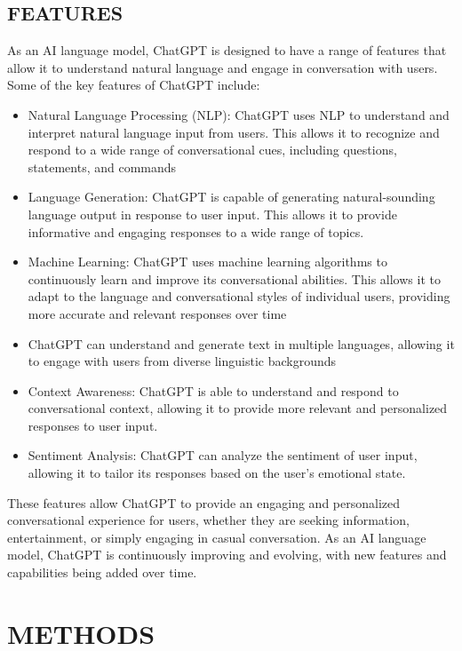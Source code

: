 \documentclass[letterpaper, 10 pt, conference]{ieeeconf}  %
\begin{document}
\subsection{FEATURES}

As an AI language model, ChatGPT is designed to have a range of features that allow it to understand natural language and engage
in conversation with users. Some of the key features of ChatGPT include:

\begin{itemize}

\item Natural Language Processing (NLP): ChatGPT uses NLP to understand and interpret natural language input from
users. This allows it to recognize and respond to a wide range of conversational cues, including questions, statements,
and commands

\item Language Generation: ChatGPT is capable of generating natural-sounding language output in response to user input.
This allows it to provide informative and engaging responses to a wide range of topics.
\item Machine Learning: ChatGPT uses machine learning algorithms to continuously learn and improve its conversational
abilities. This allows it to adapt to the language and conversational styles of individual users, providing more accurate
and relevant responses over time
\item ChatGPT can understand and generate text in multiple languages, allowing it to engage with
users from diverse linguistic backgrounds
\item Context Awareness: ChatGPT is able to understand and respond to conversational context, allowing it to provide
more relevant and personalized responses to user input.
\item Sentiment Analysis: ChatGPT can analyze the sentiment of user input, allowing it to tailor its responses based on the
user's emotional state.

\end{itemize}
These features allow ChatGPT to provide an engaging and personalized conversational experience for users, whether they are
seeking information, entertainment, or simply engaging in casual conversation. As an AI language model, ChatGPT is continuously
improving and evolving, with new features and capabilities being added over time.
\section{METHODS}
\end{document}
